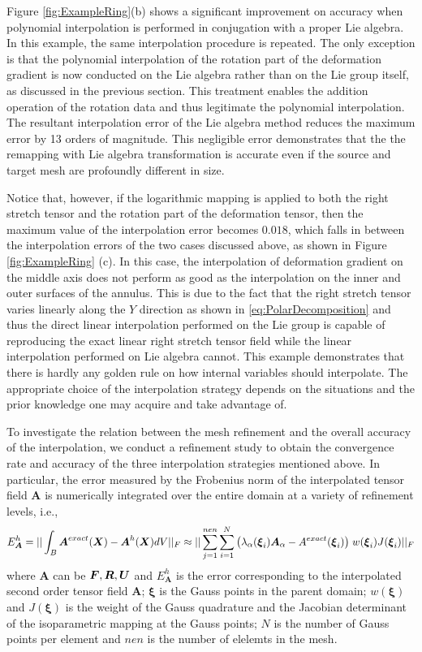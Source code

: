 \documentclass[12pt]{article}
\newcommand{\mbs}[1]{\boldsymbol{#1}}
\def\bA{{\mbs{A}}} \def\bB{{\mbs{B}}} \def\bC{{\mbs{C}}}
\def\bxi{{\mbs{\xi}}}
\begin{document}
Figure \ref{fig:ExampleRing}(b) shows a significant improvement on
accuracy when polynomial interpolation is performed in conjugation
with a proper Lie algebra.  In this example, the same interpolation
procedure is repeated. The only exception is that the polynomial
interpolation of the rotation part of the deformation gradient is now
conducted on the Lie algebra rather than on the Lie group itself, as
discussed in the previous section.  This treatment enables the
addition operation of the rotation data and thus legitimate the
polynomial interpolation. The resultant interpolation error of the Lie
algebra method reduces the maximum error by 13 orders of
magnitude. This negligible error demonstrates that the the remapping
with Lie algebra transformation is accurate even if the source and
target mesh are profoundly different in size.

Notice that, however, if the logarithmic mapping is applied to both
the right stretch tensor and the rotation part of the deformation
tensor, then the maximum value of the interpolation error becomes
$0.018$, which falls in between the interpolation errors of the two
cases discussed above, as shown in Figure \ref{fig:ExampleRing}
(c). In this case, the interpolation of deformation gradient on the
middle axis does not perform as good as the interpolation on the inner
and outer surfaces of the annulus. This is due to the fact that the
right stretch tensor varies linearly along the $Y$ direction as shown
in \ref{eq:PolarDecomposition} and thus the direct linear
interpolation performed on the Lie group is capable of reproducing the
exact linear right stretch tensor field while the linear interpolation
performed on Lie algebra cannot. This example demonstrates that there
is hardly any golden rule on how internal variables should
interpolate. The appropriate choice of the interpolation strategy
depends on the situations and the prior knowledge one may acquire and
take advantage of.

To investigate the relation between the mesh refinement and the
overall accuracy of the interpolation, we conduct a refinement study
to obtain the convergence rate and accuracy of the three interpolation
strategies mentioned above. In particular, the error measured by the
Frobenius norm of the interpolated tensor field $\bA$ is numerically
integrated over the entire domain at a variety of refinement levels,
i.e.,
\begin{equation}
  E_{\bA}^{h} =  || \int_{B} \bA^{exact} (\bX)- \bA^{h}(\bX) dV ||_{F}   
  \approx || \sum^{nen}_{j=1}\sum^{N}_{i=1} 
  \big(  \lambda_{\alpha} (\bxi_{i}) \bA_{\alpha} -
  A^{exact}(\bxi_{i}) \big) \;
  w(\bxi_{i})  J(\bxi_{i}) ||_{F} 
  \label{eq:FrobeniusNormOverall}
\end{equation}
where $\bA$ can be $\bF, \bR, \bU$ and $E_{\bA}^{h}$ is the error
corresponding to the interpolated second order tensor field $\bA$;
$\bxi$ is the Gauss points in the parent domain; $w(\bxi)$ and
$J(\bxi)$ is the weight of the Gauss quadrature and the Jacobian
determinant of the isoparametric mapping at the Gauss points; $N$ is
the number of Gauss points per element and $nen$ is the number of
elelemts in the mesh.
\end{document}
